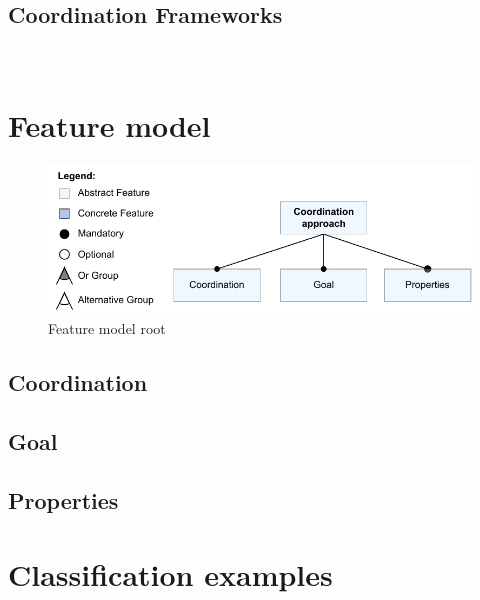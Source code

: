 \documentclass[runningheads]{llncs}
\begin{document}
\subsection{Coordination Frameworks} \label{subsec:frameworks}
\cite{varalarsenBCOolBehavioralCoordination2016,varalarsenBehavioralCoordinationOperator2015}~\cite{krauterBehavioralConsistencyMultimodeling2023}




\section{Feature model} \label{sec:features}

\begin{figure}[ht]
	\centering
	\includegraphics[width=1\textwidth]{images/root}
	\caption{Feature model root}
	\label{fig:feature_model_root}
\end{figure}

\subsection{Coordination}
\subsection{Goal}
\subsection{Properties}

\section{Classification examples} \label{sec:classifications}
\end{document}
